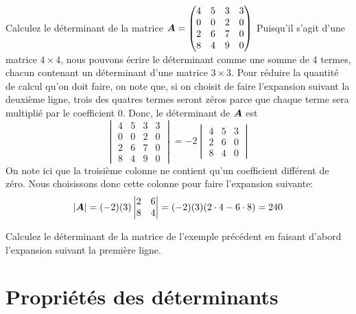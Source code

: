 \begin{exemple}
\label{ex:mat4}
Calculez le déterminant de la matrice $
\displaystyle\boldsymbol{A} = \begin{pmatrix}
4 & 5 & 3 & 3 \\
0 & 0 & 2 & 0 \\
2 & 6 & 7 & 0 \\
8 & 4 & 9 & 0
\end{pmatrix}
$
\solution
Puisqu'il s'agit d'une matrice $4\times 4$, nous pouvons écrire le déterminant
comme une somme de 4 termes, chacun contenant un déterminant d'une
matrice $3\times 3$.  Pour réduire la quantité de calcul qu'on doit faire, on
note que, si on choisit de faire l'expansion suivant la deuxième ligne, trois
des quatres termes seront zéros parce que chaque terme sera multiplié par
le coefficient 0.  Donc, le déterminant de $\boldsymbol{A}$ est
\[
\begin{vmatrix}
4 & 5 & 3 & 3 \\
0 & 0 & 2 & 0 \\
2 & 6 & 7 & 0 \\
8 & 4 & 9 & 0
\end{vmatrix}
= -2 \begin{vmatrix}
4 & 5 & 3 \\
2 & 6 & 0 \\
8 & 4 & 0
\end{vmatrix}
\] 
On note ici que la troisième colonne ne contient qu'un coefficient différent de zéro.
Nous choisissons donc cette colonne pour faire l'expansion suivante:
\[
|\boldsymbol{A}|
= (-2)(3) \begin{vmatrix}
2 & 6  \\
8 & 4 
\end{vmatrix} = (-2)(3)(2\cdot4-6\cdot8) = 240
\]
\end{exemple}
\begin{exerciceC}
Calculez le déterminant de la matrice de l'exemple précédent en faisant d'abord l'expansion
suivant la première ligne.
\end{exerciceC}
\section{Propriétés des déterminants}

